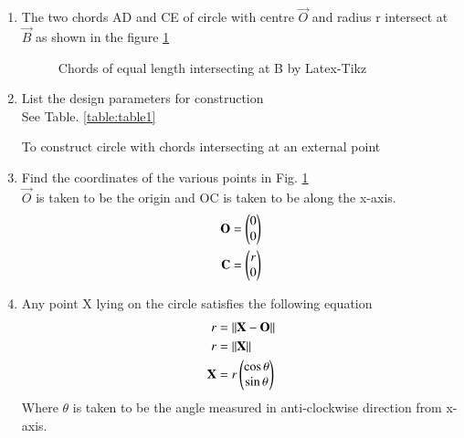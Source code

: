 %
\renewcommand{\theequation}{\theenumi}
\begin{enumerate}[label=\thesection.\arabic*.,ref=\thesection.\theenumi]

\item The two chords AD and CE of circle with centre $\vec{O}$ and radius r intersect at $\vec{B}$ as shown in the figure \ref{fig:circle}

\begin{figure}[!ht]
\centering
\resizebox{\columnwidth}{!}{}
\caption{Chords of equal length intersecting at B by Latex-Tikz}
\label{fig:circle}	
\end{figure}
%


%
%
\item List the design parameters for construction
\label{const:table1}
\\
\solution See Table. \ref{table:table1} 
%
\begin{table}[ht!]
\centering

\caption{To construct circle with chords intersecting at an external point}
\label{table:table1}	
\end{table}


\item Find the coordinates of the various points in Fig. \ref{fig:circle}
\label{const:circle_r}
\\
%
\solution $\vec{O}$ is taken to be the origin and OC is taken to be along the x-axis.
\begin{align}
\label{eq:constr_o}
\mathbf{O} &= \begin{pmatrix}0\\0\end{pmatrix} 
\\
\mathbf{C} &= \begin{pmatrix}r\\0\end{pmatrix} 
\label{eq:constr_c}
\end{align}

\item Any point X lying on the circle satisfies the following equation
 \begin{align}
r &=\left\lVert\mathbf{X}-\mathbf{O}\right\rVert
\\
r &=\left\lVert\mathbf{X}\right\rVert
\\
\mathbf{X} &= r\begin{pmatrix}\cos \theta \\ \sin \theta\end{pmatrix}
\label{eq:point_on_circle}
\end{align}
Where $\theta$ is taken to be the angle measured in anti-clockwise direction from x-axis.


\end{enumerate}
